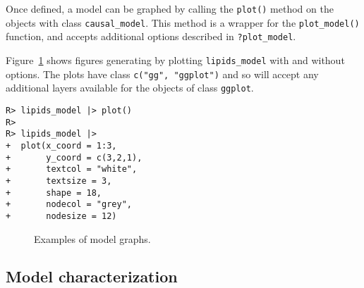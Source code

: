 \documentclass[
  11pt,
  article]{jss}
\begin{document}
Once defined, a model can be graphed by calling the \texttt{plot()}
method on the objects with class \texttt{causal\_model}. This method is
a wrapper for the \texttt{plot\_model()} function, and accepts
additional options described in \texttt{?plot\_model}.

Figure~\ref{fig-plots} shows figures generating by plotting
\texttt{lipids\_model} with and without options. The plots have class
\texttt{c("gg",\ "ggplot")} and so will accept any additional layers
available for the objects of class \texttt{ggplot}.

\begin{verbatim}
R> lipids_model |> plot()
R> 
R> lipids_model |>
+  plot(x_coord = 1:3,
+       y_coord = c(3,2,1),
+       textcol = "white",
+       textsize = 3,
+       shape = 18,
+       nodecol = "grey",
+       nodesize = 12)
\end{verbatim}

\begin{figure}

\begin{minipage}[t]{0.50\linewidth}

{\centering 


}

\end{minipage}%
%
\begin{minipage}[t]{0.50\linewidth}

{\centering 


}

\end{minipage}%

\caption{\label{fig-plots}Examples of model graphs.}

\end{figure}

\hypertarget{model-characterization}{%
\subsection{Model characterization}\label{model-characterization}}
\end{document}
